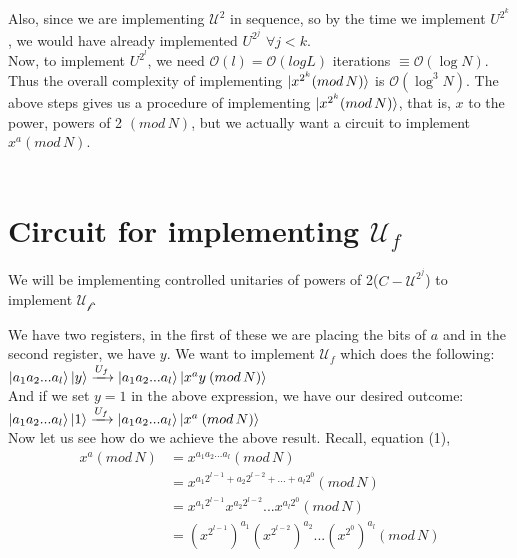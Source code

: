 \documentclass[11.5pt, paper=a4]{article}
\theoremstyle{definition}
\numberwithin{theorem}{section}
\begin{document}
Also, since we are implementing ${\mathcal{U}^2}$ in sequence, so by the time we implement $U^{2^k}$, we would have already implemented $U^{2^j}$  $\forall j<k$.\\
Now, to implement $U^{2^l}$, we need $\mathcal{O}(l) = \mathcal{O}(log L)$ iterations $\equiv \mathcal{O}(\log N)$. Thus the overall complexity of implementing $\ket{x^{2^k} (mod\,N)}$ is $\mathcal{O}(\log^3 N)$. The above steps gives us a procedure of implementing $\ket{x^{2^k} (mod\,N)}$, that is, $x$ to the power, powers of 2 $(mod\,N)$, but we actually want a circuit to implement $x^a (mod\,N)$.\\\\

\section*{Circuit for implementing \begin{math}\mathcal{U}_f\end{math}}

We will be implementing controlled unitaries of powers of 2($C-\mathcal{U}^{2^j}$) to implement $\mathcal{U_f}$.

We have two registers, in the first of these we are placing the bits of $a$ and in the second register, we have $y$. We want to implement $\mathcal{U}_f$ which does the following:\\
{$\ket{a_1 a_2 ... a_l}\ket{y} \xrightarrow{U_f} \ket{a_1 a_2 ... a_l}\ket{x^a y\:(mod\,N)}$}\\
And if we set $y = 1$ in the above expression, we have our desired outcome:\\
{$\ket{a_1 a_2 ... a_l}\ket{1} \xrightarrow{U_f} \ket{a_1 a_2 ... a_l}\ket{x^a\:(mod\,N)}$}\\

Now let us see how do we achieve the above result. Recall, equation (1),
\begin{equation}
\begin{split}
    x^a (mod\,N) & = x^{a_1 a_2 ... a_l} (mod\,N) \\
    & = x^{a_1 2^{l-1} + a_2 2^{l-2} + ... + a_l 2^{0}} (mod\,N) \\
    & = x^{a_1 2^{l-1}} x^{a_2 2^{l-2}}  ...  x^{a_l 2^{0}} (mod\,N)\\
    & = {(x^{2^{l-1}})}^{a_1} {(x^{2^{l-2}})}^{a_2}  ...  {(x^{2^{0}})}^{a_l} (mod\,N)
\end{split}
\end{equation}
\end{document}
